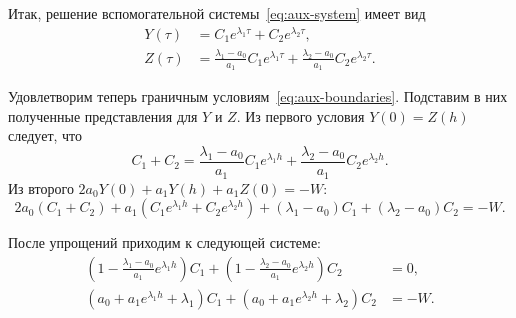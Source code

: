\documentclass[a4paper,14pt]{article}
\theoremstyle{definition}
\begin{document}
Итак, решение вспомогательной системы~\eqref{eq:aux-system}
имеет вид
\begin{equation}
  \label{eq:aux-system-gen-solution}
  \begin{aligned}
    Y(\tau) &= C_1 e^{\lambda_1 \tau} + C_2 e^{\lambda_2 \tau}, \\
    Z(\tau) &=
              \frac{\lambda_1 - a_0}{a_1} C_1 e^{\lambda_1 \tau}
              +
              \frac{\lambda_2 - a_0}{a_1} C_2 e^{\lambda_2 \tau}.
  \end{aligned}
\end{equation}

Удовлетворим теперь граничным условиям~\eqref{eq:aux-boundaries}.
Подставим в них полученные представления для $Y$ и $Z$. Из
первого условия $Y(0) = Z(h)$ следует, что
\begin{equation*}
  C_1 + C_2 =
  \frac{\lambda_1 - a_0}{a_1} C_1 e^{\lambda_1 h}
  +
  \frac{\lambda_2 - a_0}{a_1} C_2 e^{\lambda_2 h}.
\end{equation*}
Из второго $2 a_0 Y(0) + a_1 Y(h) + a_1 Z(0) = -W$:
\begin{equation*}
  2 a_0 (C_1 + C_2) + a_1 \left(
    C_1 e^{\lambda_1 h} + C_2 e^{\lambda_2 h}
  \right)
  +
  (\lambda_1 - a_0) C_1 + (\lambda_2 - a_0) C_2 = -W.
\end{equation*}

После упрощений приходим к следующей системе:
\begin{equation}
  \begin{aligned}
    \left( 1 - \frac{\lambda_1 - a_0}{a_1} e^{\lambda_1 h} \right) C_1
    +
    \left( 1 - \frac{\lambda_2 - a_0}{a_1} e^{\lambda_2 h} \right) C_2 &= 0, \\
    \left(
    a_0 + a_1 e^{\lambda_1 h} + \lambda_1
    \right) C_1
    +
    \left(
    a_0 + a_1 e^{\lambda_2 h} + \lambda_2
    \right) C_2
    &= -W.
  \end{aligned}
\end{equation}
\end{document}
